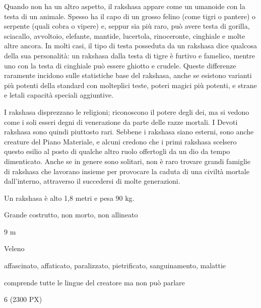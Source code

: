 \begin{multicols}{2}
{Quando non ha un altro aspetto, il rakshasa appare come un umanoide con la testa di un animale. Spesso ha il capo di un grosso felino (come tigri o pantere) o serpente (quali cobra o vipere) e, seppur sia più raro, può avere testa di gorilla, sciacallo, avvoltoio, elefante, mantide, lucertola, rinoceronte, cinghiale e molte altre ancora. In molti casi, il tipo di testa posseduta da un rakshasa dice qualcosa della sua personalità: un rakshasa dalla testa di tigre è furtivo e famelico, mentre uno con la testa di cinghiale può essere ghiotto e crudele. Queste differenze raramente incidono sulle statistiche base del rakshasa, anche se esistono varianti più potenti della standard con molteplici teste, poteri magici più potenti, e strane e letali capacità speciali aggiuntive.

I rakshasa disprezzano le religioni; riconoscono il potere degli dei, ma si vedono come i soli esseri degni di venerazione da parte delle razze mortali. I Devoti rakshasa sono quindi piuttosto rari. Sebbene i rakshasa siano esterni, sono anche creature del Piano Materiale, e alcuni credono che i primi rakshasa scelsero questo esilio al posto di qualche altro ruolo offertogli da un dio da tempo dimenticato. Anche se in genere sono solitari, non è raro trovare grandi famiglie di rakshasa che lavorano insieme per provocare la caduta di una civiltà mortale dall'interno, attraverso il succedersi di molte generazioni.

Un rakshasa è alto 1,8 metri e pesa 90 kg.

\begin{description}[noitemsep, topsep=0pt, parsep=0pt, partopsep=0pt, itemsep=1pt, leftmargin=2.35cm,  labelwidth=2.2cm, itemindent=0cm, listparindent=0pt] %
\setlength{\baselineskip}{10pt}
\item[\textbf{Taglia/Tipo}] Grande costrutto, non morto, non allineato
\item[\textbf{Caratt.}] 
\item[\textbf{Punti Ferita}] 
\item[\textbf{Movimento}] 9 m
\item[\textbf{Tiri Salvez.}] 
\item[\textbf{Imm. Danni}] Veleno
\item[\textbf{Immunità}] affascinato, affaticato, paralizzato, pietrificato, sanguinamento, malattie
\item[\textbf{Sensi}] 
\item[\textbf{Linguaggi}] comprende tutte le lingue del creatore ma non può parlare
\item[\textbf{Sfida}] 6 (2300 PX)
\end{description}
\smallskip

}
\end{multicols}
